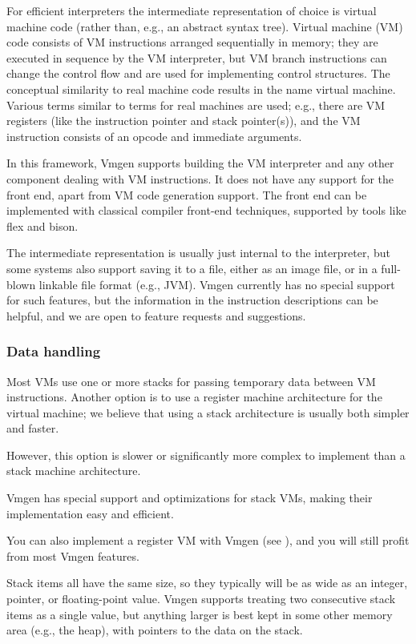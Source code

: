 \documentclass[10pt,english]{article}
\begin{document}
For efficient interpreters the intermediate representation of choice
is virtual machine code (rather than, e.g., an abstract syntax tree).
Virtual machine (VM) code consists of VM instructions arranged sequentially
in memory; they are executed in sequence by the VM interpreter, but
VM branch instructions can change the control flow and are used for
implementing control structures. The conceptual similarity to real
machine code results in the name virtual machine. Various terms similar
to terms for real machines are used; e.g., there are VM registers
(like the instruction pointer and stack pointer(s)), and the VM instruction
consists of an opcode and immediate arguments.

In this framework, Vmgen supports building the VM interpreter and
any other component dealing with VM instructions. It does not have
any support for the front end, apart from VM code generation support.
The front end can be implemented with classical compiler front-end
techniques, supported by tools like flex and bison.

The intermediate representation is usually just internal to the interpreter,
but some systems also support saving it to a file, either as an image
file, or in a full-blown linkable file format (e.g., JVM). Vmgen currently
has no special support for such features, but the information in the
instruction descriptions can be helpful, and we are open to feature
requests and suggestions.


\subsubsection{Data handling}

Most VMs use one or more stacks for passing temporary data between
VM instructions. Another option is to use a register machine architecture
for the virtual machine; we believe that using a stack architecture
is usually both simpler and faster.

However, this option is slower or significantly more complex to implement
than a stack machine architecture.

Vmgen has special support and optimizations for stack VMs, making
their implementation easy and efficient.

You can also implement a register VM with Vmgen (see ),
and you will still profit from most Vmgen features.

Stack items all have the same size, so they typically will be as wide
as an integer, pointer, or floating-point value. Vmgen supports treating
two consecutive stack items as a single value, but anything larger
is best kept in some other memory area (e.g., the heap), with pointers
to the data on the stack.
\end{document}
